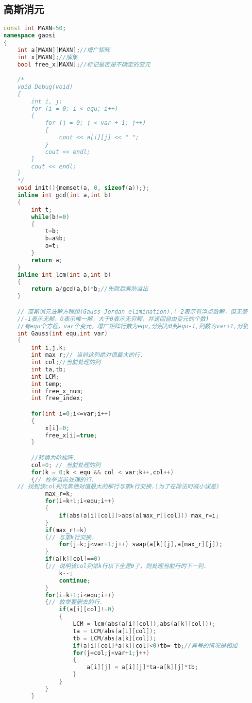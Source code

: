\subsection{高斯消元}
\begin{lstlisting}[language=C++]
const int MAXN=50;
namespace gaosi
{
    int a[MAXN][MAXN];//增广矩阵
    int x[MAXN];//解集
    bool free_x[MAXN];//标记是否是不确定的变元

    /*
    void Debug(void)
    {
        int i, j;
        for (i = 0; i < equ; i++)
        {
            for (j = 0; j < var + 1; j++)
            {
                cout << a[i][j] << " ";
            }
            cout << endl;
        }
        cout << endl;
    }
    */
	void init(){memset(a, 0, sizeof(a));};
    inline int gcd(int a,int b)
    {
        int t;
        while(b!=0)
        {
            t=b;
            b=a%b;
            a=t;
        }
        return a;
    }
    inline int lcm(int a,int b)
    {
        return a/gcd(a,b)*b;//先除后乘防溢出
    }

    // 高斯消元法解方程组(Gauss-Jordan elimination).(-2表示有浮点数解，但无整数解，
    //-1表示无解，0表示唯一解，大于0表示无穷解，并返回自由变元的个数)
    //有equ个方程，var个变元。增广矩阵行数为equ,分别为0到equ-1,列数为var+1,分别为0到var.
    int Gauss(int equ,int var)
    {
        int i,j,k;
        int max_r;// 当前这列绝对值最大的行.
        int col;//当前处理的列
        int ta,tb;
        int LCM;
        int temp;
        int free_x_num;
        int free_index;

        for(int i=0;i<=var;i++)
        {
            x[i]=0;
            free_x[i]=true;
        }

        //转换为阶梯阵.
        col=0; // 当前处理的列
        for(k = 0;k < equ && col < var;k++,col++)
        {// 枚举当前处理的行.
    // 找到该col列元素绝对值最大的那行与第k行交换.(为了在除法时减小误差)
            max_r=k;
            for(i=k+1;i<equ;i++)
            {
                if(abs(a[i][col])>abs(a[max_r][col])) max_r=i;
            }
            if(max_r!=k)
            {// 与第k行交换.
                for(j=k;j<var+1;j++) swap(a[k][j],a[max_r][j]);
            }
            if(a[k][col]==0)
            {// 说明该col列第k行以下全是0了，则处理当前行的下一列.
                k--;
                continue;
            }
            for(i=k+1;i<equ;i++)
            {// 枚举要删去的行.
                if(a[i][col]!=0)
                {
                    LCM = lcm(abs(a[i][col]),abs(a[k][col]));
                    ta = LCM/abs(a[i][col]);
                    tb = LCM/abs(a[k][col]);
                    if(a[i][col]*a[k][col]<0)tb=-tb;//异号的情况是相加
                    for(j=col;j<var+1;j++)
                    {
                        a[i][j] = a[i][j]*ta-a[k][j]*tb;
                    }
                }
            }
        }


\end{lstlisting}
